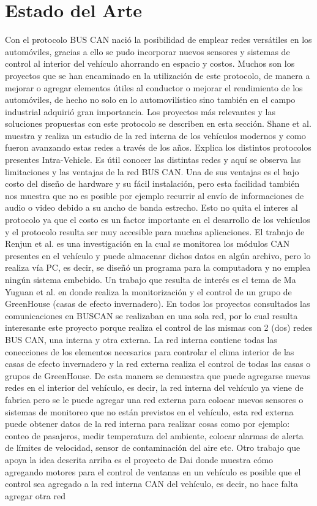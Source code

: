 \section{Estado del Arte}

Con el protocolo BUS CAN nació la posibilidad de emplear redes versátiles en los automóviles, gracias a ello se pudo incorporar nuevos sensores y sistemas de control al interior del vehículo ahorrando en espacio y costos. Muchos son los proyectos que se han encaminado en la utilización de este protocolo, de manera a mejorar o agregar elementos útiles al conductor o mejorar el rendimiento de los automóviles, de hecho no solo en lo automovilístico sino también en el campo industrial adquirió gran importancia. Los proyectos más relevantes y las soluciones propuestas con este protocolo se describen en esta sección. Shane et al. \cite{IVN} muestra y realiza un estudio de la red interna de los vehículos modernos y como fueron avanzando estas redes a través de los años. Explica los distintos protocolos presentes Intra-Vehicle. Es útil conocer las distintas redes y aquí se observa las limitaciones y las ventajas de la red BUS CAN. Una de sus ventajas es el bajo costo del diseño de hardware y su fácil instalación, pero esta facilidad también nos muestra que no es posible por ejemplo recurrir al envío de informaciones de audio o video debido a su ancho de banda estrecho. Esto no quita el interes al protocolo ya que el costo es un factor importante en el desarrollo de los vehículos y el protocolo resulta ser muy accesible para muchas aplicaciones. El trabajo de Renjun et al. \cite{CMS} es una investigación en la cual se monitorea los módulos CAN presentes en el vehículo y puede almacenar dichos datos en algún archivo, pero lo realiza vía PC, es decir, se diseñó un programa para la computadora y no emplea ningún sistema embebido. Un trabajo que resulta de interés es el tema de Ma Yuguan et al. \cite {GHG} en donde realiza la monitorización y el control de un grupo de GreenHouse (casas de efecto invernadero). En todos los proyectos consultados las comunicaciones en BUSCAN se realizaban en una sola red, por lo cual resulta interesante  este proyecto porque realiza el control de las mismas con 2 (dos) redes  BUS CAN, una interna y otra externa. La red interna contiene todas las conecciones de los elementos necesarios para controlar el clima interior de las casas de efecto invernadero y la red externa realiza el control de todas las casas o grupos de GreenHouse.  De esta manera se demuestra que puede agregarse nuevas redes en el interior del vehículo, es decir, la red interna del vehículo ya viene de fabrica pero se le puede agregar una red externa para colocar nuevos sensores o sistemas de monitoreo que no están previstos en el vehículo, esta red externa puede obtener datos de la red interna para realizar cosas como por ejemplo: conteo de pasajeros, medir  temperatura del ambiente, colocar alarmas de alerta de límites de velocidad, sensor de contaminación del aire etc. Otro trabajo que apoya la idea descrita arriba es el proyecto de Dai \cite {DOR} donde muestra cómo agregando motores para el control de ventanas en un vehículo es posible que el control sea agregado a la red interna CAN del vehículo, es decir, no hace falta agregar otra red 